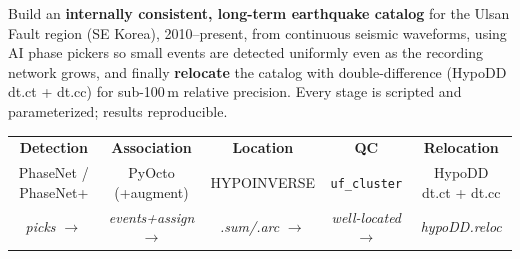 \documentclass[11pt]{article}
\newcommand{\code}[1]{\texttt{#1}}
\begin{document}
Build an \textbf{internally consistent, long-term earthquake catalog} for the Ulsan Fault region (SE Korea),
2010–present, from continuous seismic waveforms, using AI phase pickers so small events are detected uniformly
even as the recording network grows, and finally \textbf{relocate} the catalog with double-difference (HypoDD
dt.ct + dt.cc) for sub-100\,m relative precision. Every stage is scripted and parameterized; results reproducible.

\begin{center}
\small
\begin{tabular}{@{}ccccc@{}}
\textbf{Detection} & \textbf{Association} & \textbf{Location} & \textbf{QC} & \textbf{Relocation} \\
PhaseNet / PhaseNet+ & PyOcto (+augment) & HYPOINVERSE & \code{uf\_cluster} & HypoDD dt.ct + dt.cc \\
\emph{picks} $\rightarrow$ & \emph{events+assign} $\rightarrow$ & \emph{.sum/.arc} $\rightarrow$ & \emph{well-located} $\rightarrow$ & \emph{hypoDD.reloc} \\
\end{tabular}
\end{center}
\end{document}
